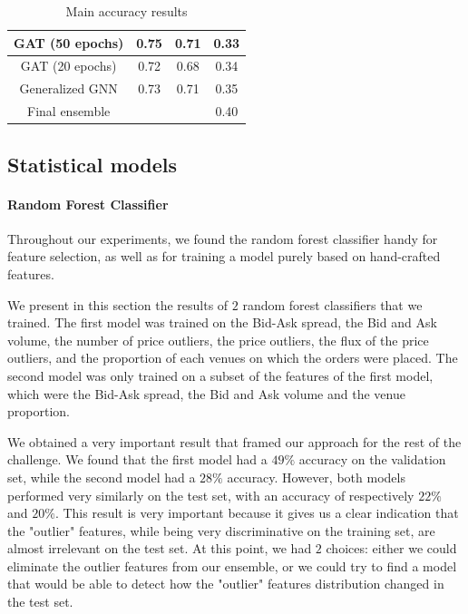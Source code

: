 \documentclass[switch, 11pt]{article}
\begin{document}
\begin{multicols}{2}
\begin{table}[H]
\begin{center}
{\begin{tabular}{|c|c|c|c|}
                    GAT (50 epochs)            & 0.75                   & 0.71                     & 0.33               \\
                    \hline
                    GAT (20 epochs)            & 0.72                   & 0.68                     & 0.34               \\
                    \hline
                    Generalized GNN            & 0.73                   & 0.71                     & 0.35               \\
                    \hline
                    Final ensemble             &                        &                          & 0.40               \\
                    \hline
                \end{tabular}
            }
        \end{center}
        \caption{Main accuracy results}
        \label{tab:results}
    \end{table}


    \subsection{Statistical models}
    \paragraph{Random Forest Classifier}
    Throughout our experiments, we found the random forest classifier handy for feature selection, as well as for training a model purely based on hand-crafted features.

    We present in this section the results of $2$ random forest classifiers that we trained. The first model was trained on the Bid-Ask spread, the Bid and Ask volume, the number of price outliers, the price outliers, the flux of the price outliers, and the proportion of each venues on which the orders were placed. The second model was only trained on a subset of the features of the first model, which were the Bid-Ask spread, the Bid and Ask volume and the venue proportion.

    We obtained a very important result that framed our approach for the rest of the challenge. We found that the first model had a $49\%$ accuracy on the validation set, while the second model had a $28\%$ accuracy. However, both models performed very similarly on the test set, with an accuracy of respectively $22\%$ and $20\%$. This result is very important because it gives us a clear indication that the "outlier" features, while being very discriminative on the training set, are almost irrelevant on the test set. At this point, we had $2$ choices: either we could eliminate the outlier features from our ensemble, or we could try to find a model that would be able to detect how the "outlier" features distribution changed in the test set.


\end{multicols}
\end{document}
